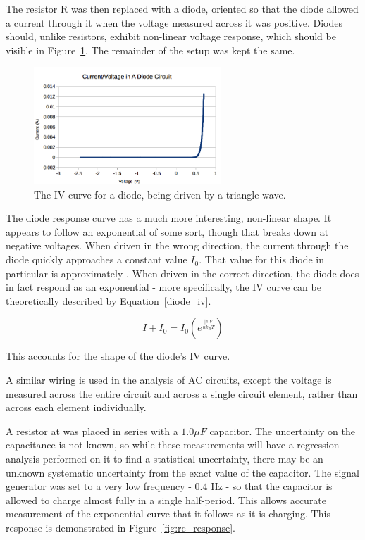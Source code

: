 \documentclass[journal]{IEEEtran}
\begin{document}
The resistor R was then replaced with a diode, oriented so that the diode
allowed a current through it when the voltage measured across it was positive.
Diodes should, unlike resistors, exhibit non-linear voltage response, which
should be visible in Figure~\ref{fig:dio_series}. The remainder of the setup
was kept the same.

\begin{figure}[ht!]
\centering
\includegraphics[width=70mm]{iv_diode.png}
\caption{The IV curve for a diode, being driven by a triangle wave.}
\label{fig:dio_series}
\end{figure}

The diode response curve has a much more interesting, non-linear shape. It
appears to follow an exponential of some sort, though that breaks down at
negative voltages. When driven in the wrong direction, the current through the
diode quickly approaches a constant value $I _0$. That value for this diode in
particular is approximately . When driven in the correct
direction, the diode does in fact respond as an exponential - more
specifically, the IV curve can be theoretically described by
Equation~\ref{diode_iv}.

\begin{equation}
\label{diode_iv}
I + I_0 = I_0 \left( e^{\frac{|e|V}{n k_B T}} \right)
\end{equation}

This accounts for the shape of the diode's IV curve.

A similar wiring is used in the analysis of AC circuits, except the voltage is
measured across the entire circuit and across a single circuit element, rather
than across each element individually.

A resistor at  was placed in series with a $1.0 \mu
F$ capacitor. The uncertainty on the capacitance is not known, so while these
measurements will have a regression analysis performed on it to find a
statistical uncertainty, there may be an unknown systematic uncertainty from
the exact value of the capacitor. The signal generator was set to a very low
frequency - 0.4 Hz - so that the capacitor is allowed to charge almost fully
in a single half-period. This allows accurate measurement of the exponential
curve that it follows as it is charging. This response is demonstrated in
Figure~\ref{fig:rc_response}.
\end{document}
